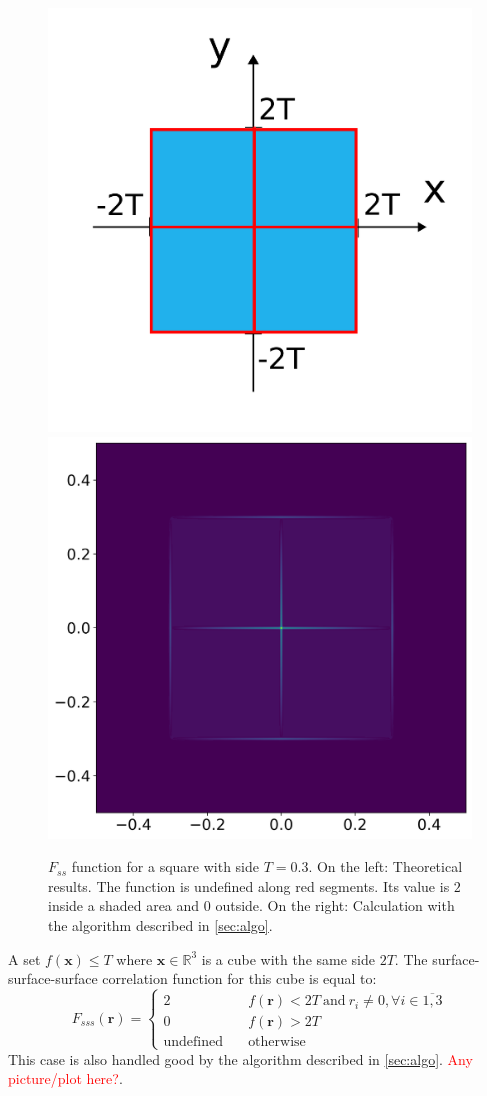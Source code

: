 \documentclass[reprint,amsmath,amssymb,aps,pre,showkeys,showpacs]{revtex4-1}
\begin{document}
\begin{figure}
  \centering
  \includegraphics[width=0.45\linewidth]{images/fss-square.png}
  \hfill
  \includegraphics[width=0.45\linewidth]{images/fss-square-julia.png}
  \caption[]{$F_{ss}$ function for a square with side $T = 0.3$. On the left:
    Theoretical results. The function is undefined along red segments. Its value
    is $2$ inside a shaded area and $0$ outside. On the right: Calculation with
    the algorithm described in \cref{sec:algo}.}
  \label{fig:fss-square}
\end{figure}

A set $f(\bm{x}) \le T$ where $\bm{x} \in \mathbb{R}^3$ is a cube with the same
side $2T$.
The surface-surface-surface correlation function for this cube is equal to:
\begin{equation*}
  F_{sss}(\bm{r}) = \left\{
  \begin{array}{ll}
    2 & \quad f(\bm{r}) < 2T \ \text{and}\ r_i \ne 0, \forall i \in \overline{1,3} \\
    0 & \quad f(\bm{r}) > 2T \\
    \text{undefined} & \quad \text{otherwise}
  \end{array}
  \right.
\end{equation*}
This case is also handled good by the algorithm described in
\cref{sec:algo}. \textcolor{red}{Any picture/plot here?}.
\end{document}
